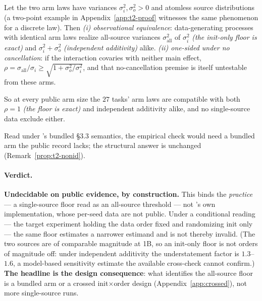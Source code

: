 \begin{remark}
\label{prop:t2-nonid}
Let the two arm laws have variances $\sigma_i^2, \sigma_o^2 > 0$ and atomless source
distributions (a two-point example in Appendix~\ref{app:t2-proof} witnesses the same
phenomenon for a discrete law). Then
\emph{(i) observational equivalence}: data-generating processes with identical arm laws realize
all-source variances $\sigma_{\mathrm{all}}^2$ of $\sigma_i^2$ \emph{(the init-only floor is
exact)} and $\sigma_i^2 + \sigma_o^2$ \emph{(independent additivity)} alike.
\emph{(ii) one-sided under no cancellation}: if the interaction covaries with neither main
effect, $\rho = \sigma_{\mathrm{all}}/\sigma_i \ge \sqrt{1 + \sigma_o^2/\sigma_i^2}$, and that
no-cancellation premise is itself untestable from these arms.
\end{remark}

So at every public arm size the $27$ tasks' arm laws are compatible with both $\rho = 1$
\emph{(the floor is exact)} and independent additivity alike, and no single-source data
exclude either.

Read under \citet{tencent2026}'s bundled \S3.3 semantics, the empirical check would need a
bundled arm the public record lacks; the structural answer is unchanged
(Remark~\ref{prop:t2-nonid}).

\paragraph{Verdict.}
\label{sec:t2-verdict}
\textbf{Undecidable on public evidence, by construction.} This binds the
\emph{practice} --- a single-source floor read as an all-source threshold --- not
\citet{tencent2026}'s own implementation, whose per-seed data are not public. Under a
conditional reading --- the target experiment holding the data order fixed and randomizing
init only --- the same floor estimates a narrower estimand and is not thereby invalid.
(The two sources are of comparable magnitude at 1B, so an init-only floor is not orders of
magnitude off: under independent additivity the understatement factor is $1.3$--$1.6$, a
model-based sensitivity estimate the available cross-check cannot confirm.)
\textbf{The headline
is the design consequence}: what identifies the all-source floor is a bundled arm or a crossed
init$\times$order design (Appendix~\ref{app:crossed}), not more single-source runs.
